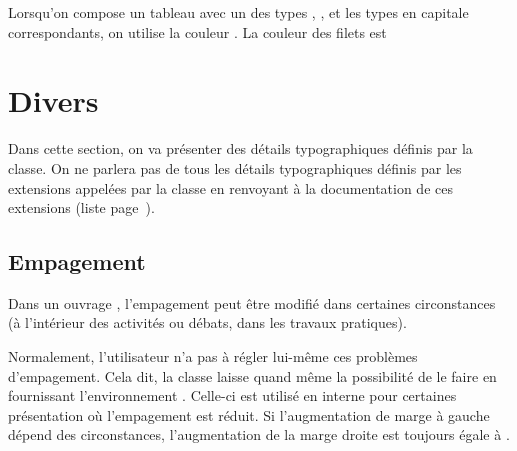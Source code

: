 \documentclass[nocrop]{sesamanuel}
\begin{document}
Lorsqu'on compose un tableau avec un des types , ,
 et les types en capitale correspondants, on utilise la
couleur . La couleur des filets est

\section{Divers}
Dans cette section, on va présenter des détails typographiques définis
par la classe. On ne parlera pas de tous les détails typographiques
définis par les extensions appelées par la classe en renvoyant à la
documentation de ces extensions (liste page~\pageref{tab-extensions}).

\subsection{Empagement}
Dans un ouvrage \Logosesa{}, l'empagement peut être modifié dans
certaines circonstances (à l'intérieur des activités ou débats, dans
les travaux pratiques).

Normalement, l'utilisateur n'a pas à régler lui-même ces problèmes
d'empagement. Cela dit, la classe laisse quand même la possibilité de
le faire en fournissant l'environnement
. Celle-ci est utilisé en interne pour certaines
présentation où l'empagement est réduit. Si l'augmentation de marge à
gauche dépend des circonstances, l'augmentation de la marge droite est
toujours égale à .
\end{document}
